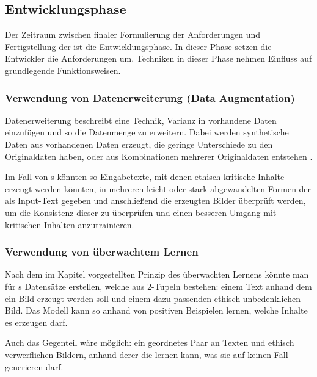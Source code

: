 \documentclass[hidelinks,12pt]{report}
\begin{document}
\subsection{Entwicklungsphase}
Der Zeitraum zwischen finaler Formulierung der Anforderungen und Fertigstellung der  ist die Entwicklungsphase. In dieser Phase setzen die Entwickler die Anforderungen um. Techniken in dieser Phase nehmen Einfluss auf grundlegende Funktionsweisen.

\subsubsection{Verwendung von Datenerweiterung (Data Augmentation)}
Datenerweiterung beschreibt eine Technik, Varianz in vorhandene Daten einzufügen und so die Datenmenge zu erweitern. Dabei werden synthetische Daten aus vorhandenen Daten erzeugt, die geringe Unterschiede zu den Originaldaten haben, oder aus Kombinationen mehrerer Originaldaten entstehen \cite[S. 2]{Shorten}. %

Im Fall von s könnten so Eingabetexte, mit denen ethisch kritische Inhalte erzeugt werden könnten, in mehreren leicht oder stark abgewandelten Formen der  als Input-Text 
gegeben und anschließend die erzeugten Bilder überprüft werden, um die Konsistenz dieser zu überprüfen und einen besseren Umgang mit kritischen Inhalten anzutrainieren.  

\subsubsection{Verwendung von überwachtem Lernen}\label{Supervised Learning}
Nach dem im Kapitel  vorgestellten Prinzip des überwachten Lernens könnte man für s Datensätze erstellen, welche aus 2-Tupeln bestehen: einem Text anhand dem ein Bild erzeugt werden soll und einem dazu passenden ethisch unbedenklichen Bild. Das Modell kann so anhand von positiven Beispielen lernen, welche Inhalte es erzeugen darf.

Auch das Gegenteil wäre möglich: ein geordnetes Paar an Texten und ethisch verwerflichen Bildern, anhand derer die  lernen kann, was sie auf keinen Fall generieren darf.
\end{document}
